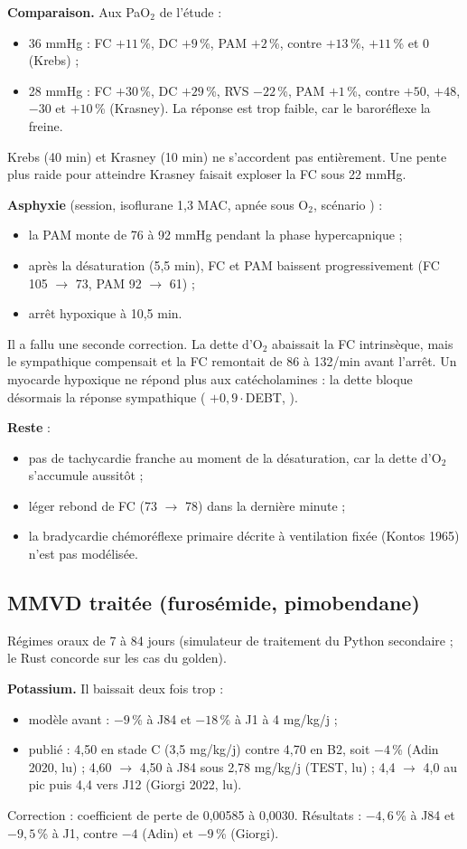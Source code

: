 \documentclass[10pt,a4paper]{article}
\newcommand{\vp}[1]{\path{#1}}
\begin{document}
\textbf{Comparaison.} Aux PaO$_2$ de l'étude :
\begin{itemize}
\item 36 mmHg : FC $+11$\,\%, DC $+9$\,\%, PAM $+2$\,\%, contre $+13$\,\%, $+11$\,\% et 0 (Krebs) ;
\item 28 mmHg : FC $+30$\,\%, DC $+29$\,\%, RVS $-22$\,\%, PAM $+1$\,\%, contre $+50$, $+48$, $-30$ et $+10$\,\% (Krasney). La réponse est trop faible, car le baroréflexe la freine.
\end{itemize}
Krebs (40 min) et Krasney (10 min) ne s'accordent pas entièrement. Une pente plus raide pour atteindre Krasney faisait exploser la FC sous 22 mmHg.

\textbf{Asphyxie} (session, isoflurane 1,3 MAC, apnée sous O$_2$, scénario \vp{asphyxie}) :
\begin{itemize}
\item la PAM monte de 76 à 92 mmHg pendant la phase hypercapnique ;
\item après la désaturation (5,5 min), FC et PAM baissent progressivement (FC 105 $\to$ 73, PAM 92 $\to$ 61) ;
\item arrêt hypoxique à 10,5 min.
\end{itemize}
Il a fallu une seconde correction. La dette d'O$_2$ abaissait la FC intrinsèque, mais le sympathique compensait et la FC remontait de 86 à 132/min avant l'arrêt. Un myocarde hypoxique ne répond plus aux catécholamines : la dette bloque désormais la réponse sympathique (\vp{beta_block} $+0{,}9\cdot$DEBT, \vp{hypoxia_effects}).

\textbf{Reste} :
\begin{itemize}
\item pas de tachycardie franche au moment de la désaturation, car la dette d'O$_2$ s'accumule aussitôt ;
\item léger rebond de FC (73 $\to$ 78) dans la dernière minute ;
\item la bradycardie chémoréflexe primaire décrite à ventilation fixée (Kontos 1965) n'est pas modélisée.
\end{itemize}

\subsection{MMVD traitée (furosémide, pimobendane)}
Régimes oraux de 7 à 84 jours (simulateur de traitement du Python secondaire ; le Rust concorde sur les cas du golden).

\textbf{Potassium.} Il baissait deux fois trop :
\begin{itemize}
\item modèle avant : $-9$\,\% à J84 et $-18$\,\% à J1 à 4 mg/kg/j ;
\item publié : 4,50 en stade C (3,5 mg/kg/j) contre 4,70 en B2, soit $-4$\,\% (Adin 2020, lu) ; 4,60 $\to$ 4,50 à J84 sous 2,78 mg/kg/j (TEST, lu) ; 4,4 $\to$ 4,0 au pic puis 4,4 vers J12 (Giorgi 2022, lu).
\end{itemize}
Correction : coefficient de perte de 0,00585 à 0,0030. Résultats : $-4{,}6$\,\% à J84 et $-9{,}5$\,\% à J1, contre $-4$ (Adin) et $-9$\,\% (Giorgi).
\end{document}
